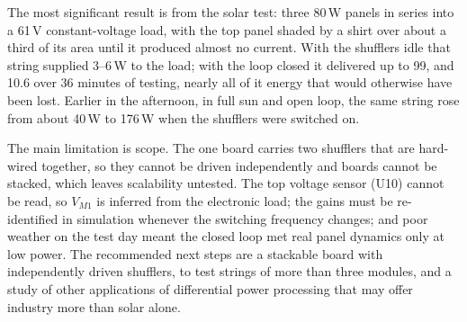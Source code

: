 The most significant result is from the solar test: three 80\,W panels in series into a 61\,V constant-voltage load, with the top panel shaded by a shirt over about a third of its area until it produced almost no current. With the shufflers idle that string supplied 3--6\,W to the load; with the loop closed it delivered up to 99\W, and 10.6\Wh{} over 36 minutes of testing, nearly all of it energy that would otherwise have been lost. Earlier in the afternoon, in full sun and open loop, the same string rose from about 40\,W to 176\,W when the shufflers were switched on.

The main limitation is scope. The one board carries two shufflers that are hard-wired together, so they cannot be driven independently and boards cannot be stacked, which leaves scalability untested. The top voltage sensor (U10) cannot be read, so $V_{M1}$ is inferred from the electronic load; the gains must be re-identified in simulation whenever the switching frequency changes; and poor weather on the test day meant the closed loop met real panel dynamics only at low power. The recommended next steps are a stackable board with independently driven shufflers, to test strings of more than three modules, and a study of other applications of differential power processing that may offer industry more than solar alone.
